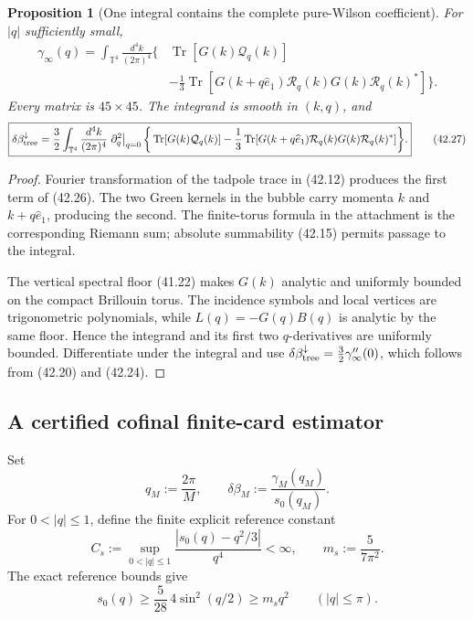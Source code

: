\documentclass[11pt,oneside]{book}
\newtheorem{proposition}[theorem]{Proposition}
\theoremstyle{definition}
\theoremstyle{remark}
\newcommand{\Tr}{\operatorname{Tr}}
\begin{document}
\begin{proposition}[One integral contains the complete pure-Wilson
coefficient]
\label{prop:e8v42-BZ-integral}
For \(|q|\) sufficiently small,
\[
 \boxed{
 \begin{split}
 \gamma_\infty(q)
 =\int_{\mathbb T^4}\frac{d^4k}{(2\pi)^4}
 \bigg\{&
 \Tr[G(k)\mathcal Q_q(k)]\\
 &-\frac13\Tr[
 G(k+q\widehat e_1)\mathcal R_q(k)
 G(k)\mathcal R_q(k)^*]\bigg\}.
 \end{split}}                                                   \tag{42.26}
\]
Every matrix is \(45\times45\).  The integrand is smooth in
\((k,q)\), and
\[
 \boxed{
 \delta\beta_{\rm tree}^{\downarrow}
 =\frac32\int_{\mathbb T^4}\frac{d^4k}{(2\pi)^4}
 \left.\partial_q^2\right|_{q=0}
 \bigg\{
 \Tr[G(k)\mathcal Q_q(k)]
 -\frac13\Tr[
 G(k+q\widehat e_1)\mathcal R_q(k)
 G(k)\mathcal R_q(k)^*]\bigg\}.}                               \tag{42.27}
\]
\end{proposition}

\begin{proof}
Fourier transformation of the tadpole trace in (42.12) produces the
first term of (42.26).  The two Green kernels in the bubble carry
momenta \(k\) and \(k+q\widehat e_1\), producing the second.  The
finite-torus formula in the attachment is the corresponding Riemann
sum; absolute summability (42.15) permits passage to the integral.

The vertical spectral floor (41.22) makes \(G(k)\) analytic and
uniformly bounded on the compact Brillouin torus.  The incidence
symbols and local vertices are trigonometric polynomials, while
\(L(q)=-G(q)B(q)\) is analytic by the same floor.  Hence the
integrand and its first two \(q\)-derivatives are uniformly bounded.
Differentiate under the integral and use
\(\delta\beta_{\rm tree}^{\downarrow}
=\tfrac32\gamma_\infty''(0)\), which follows from (42.20) and
(42.24).
\end{proof}

\subsection{A certified cofinal finite-card estimator}

Set
\[
 q_M:=\frac{2\pi}{M},\qquad
 \delta\beta_M:=\frac{\gamma_M(q_M)}{s_0(q_M)}.                 \tag{42.28}
\]
For \(0<|q|\le1\), define the finite explicit reference constant
\[
 C_s:=\sup_{0<|q|\le1}
 \frac{|s_0(q)-q^2/3|}{q^4}<\infty,\qquad
 m_s:=\frac5{7\pi^2}.                                          \tag{42.29}
\]
The exact reference bounds give
\[
 s_0(q)\ge\frac5{28}\,4\sin^2(q/2)
 \ge m_sq^2\qquad(|q|\le\pi).                                  \tag{42.30}
\]
\end{document}
